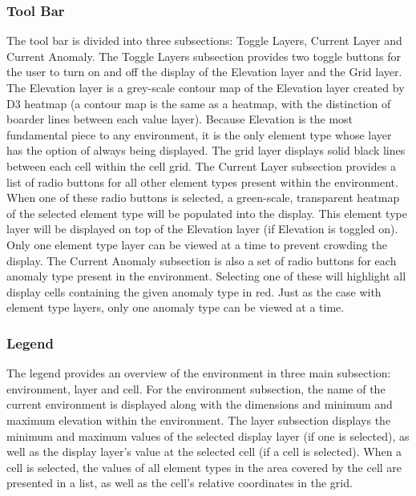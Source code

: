 \subsubsection{Tool Bar}
The tool bar is divided into three subsections: Toggle Layers, Current Layer and Current Anomaly.
The Toggle Layers subsection provides two toggle buttons for the user to turn on and off the display of the Elevation layer and the Grid layer.
The Elevation layer is a grey-scale contour map of the Elevation layer created by D3 heatmap (a contour map is the same as a heatmap, with the distinction of boarder lines between each value layer).
Because Elevation is the most fundamental piece to any environment, it is the only element type whose layer has the option of always being displayed.
The grid layer displays solid black lines between each cell within the cell grid.
The Current Layer subsection provides a list of radio buttons for all other element types present within the environment.
When one of these radio buttons is selected, a green-scale, transparent heatmap of the selected element type will be populated into the display.
This element type layer will be displayed on top of the Elevation layer (if Elevation is toggled on).
Only one element type layer can be viewed at a time to prevent crowding the display.
The Current Anomaly subsection is also a set of radio buttons for each anomaly type present in the environment.
Selecting one of these will highlight all display cells containing the given anomaly type in red.
Just as the case with element type layers, only one anomaly type can be viewed at a time.


\subsubsection{Legend}
The legend provides an overview of the environment in three main subsection: environment, layer and cell.
For the environment subsection, the name of the current environment is displayed along with the dimensions and minimum and maximum elevation within the environment.
The layer subsection displays the minimum and maximum values of the selected display layer (if one is selected), as well as the display layer's value at the selected cell (if a cell is selected).
When a cell is selected, the values of all element types in the area covered by the cell are presented in a list, as well as the cell's relative coordinates in the grid.


